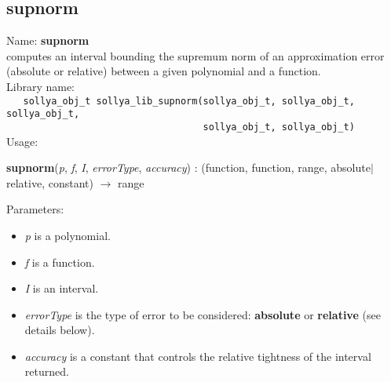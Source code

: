 \subsection{supnorm}
\label{labsupnorm}
\noindent Name: \textbf{supnorm}\\
\phantom{aaa}computes an interval bounding the supremum norm of an approximation error (absolute or relative) between a given polynomial and a function.\\[0.2cm]
\noindent Library name:\\
\verb|   sollya_obj_t sollya_lib_supnorm(sollya_obj_t, sollya_obj_t, sollya_obj_t,|\\
\verb|                                   sollya_obj_t, sollya_obj_t)|\\[0.2cm]
\noindent Usage: 
\begin{center}
\textbf{supnorm}(\emph{p}, \emph{f}, \emph{I}, \emph{errorType}, \emph{accuracy}) : (\textsf{function}, \textsf{function}, \textsf{range}, \textsf{absolute$|$relative}, \textsf{constant}) $\rightarrow$ \textsf{range}\\
\end{center}
Parameters: 
\begin{itemize}
\item \emph{p} is a polynomial.
\item \emph{f} is a function.
\item \emph{I} is an interval.
\item \emph{errorType} is the type of error to be considered: \textbf{absolute} or \textbf{relative} (see details below).
\item \emph{accuracy} is a constant that controls the relative tightness of the interval returned. 
\end{itemize}

